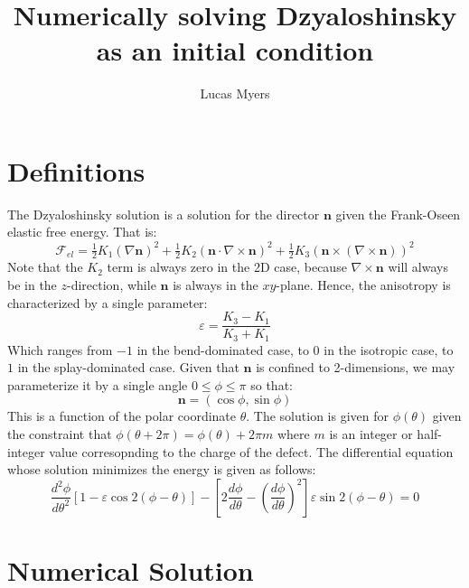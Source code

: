 \documentclass[reqno]{article}
\begin{document}
\title{Numerically solving Dzyaloshinsky as an initial condition}
\author{Lucas Myers}
\maketitle

\section{Definitions}

The Dzyaloshinsky solution is a solution for the director $\mathbf{n}$ given the Frank-Oseen elastic free energy.
That is:
\begin{equation}
    \mathcal{F}_{el}
    =
    \tfrac12 K_1 \left( \nabla \mathbf{n} \right)^2
    + \tfrac12 K_2 \left( \mathbf{n} \cdot \nabla \times \mathbf{n} \right)^2
    + \tfrac12 K_3 \left( \mathbf{n} \times \left( \nabla \times \mathbf{n}\right) \right)^2
\end{equation}
Note that the $K_2$ term is always zero in the 2D case, because $\nabla \times \mathbf{n}$ will always be in the $z$-direction, while $\mathbf{n}$ is always in the $xy$-plane.
Hence, the anisotropy is characterized by a single parameter:
\begin{equation}
    \varepsilon = \frac{K_3 - K_1}{K_3 + K_1}
\end{equation}
Which ranges from $-1$ in the bend-dominated case, to $0$ in the isotropic case, to $1$ in the splay-dominated case.
Given that $\mathbf{n}$ is confined to 2-dimensions, we may parameterize it by a single angle $0 \leq \phi \leq \pi$ so that:
\begin{equation}
    \mathbf{n} = \left(\cos\phi, \sin\phi\right)
\end{equation}
This is a function of the polar coordinate $\theta$.
The solution is given for $\phi(\theta)$ given the constraint that $\phi(\theta + 2\pi) = \phi(\theta) + 2\pi m$ where $m$ is an integer or half-integer value corresopnding to the charge of the defect.
The differential equation whose solution minimizes the energy is given as follows:
\begin{equation}
    \frac{d^2 \phi}{d \theta^2}
    \left[ 1 - \varepsilon \cos 2 \left( \phi - \theta \right) \right]
    - \left[ 2 \frac{d \phi}{d\theta} - \left( \frac{d \phi}{d\theta} \right)^2 \right]
    \varepsilon \sin 2 \left( \phi - \theta \right)
    =
    0
\end{equation}

\section{Numerical Solution}
\end{document}

